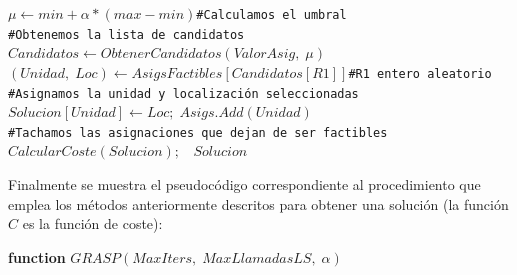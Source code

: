 \documentclass[11pt,a4paper]{article}
\begin{document}
\begin{algorithm}
{{				$\mu \leftarrow min + \alpha * (max - min)$\texttt{\#Calculamos el umbral}\\
				\texttt{\#Obtenemos la lista de candidatos}\\
				$Candidatos \leftarrow ObtenerCandidatos(ValorAsig,\; \mu)$\\
				$(Unidad,\;Loc) \leftarrow AsigsFactibles[Candidatos[R1]]$\texttt{\#R1 entero aleatorio}\\
				\texttt{\#Asignamos la unidad y localización seleccionadas}\\
				$Solucion[Unidad] \leftarrow Loc;\;Asigs.Add(Unidad)$\\
				\texttt{\#Tachamos las asignaciones que dejan de ser factibles}\\
			}
			$CalcularCoste(Solucion);\;\;$ \KwRet $Solucion$
			
		}
		
	\end{algorithm}

	\noindent Finalmente se muestra el pseudocódigo correspondiente al procedimiento que emplea los métodos anteriormente descritos para obtener una solución (la función $C$ es la función de coste):
	
	\begin{algorithm}
		
		\textbf{function} $GRASP(MaxIters,\;MaxLlamadasLS,\;\alpha)$
		
	\end{algorithm}
	
\end{document}
